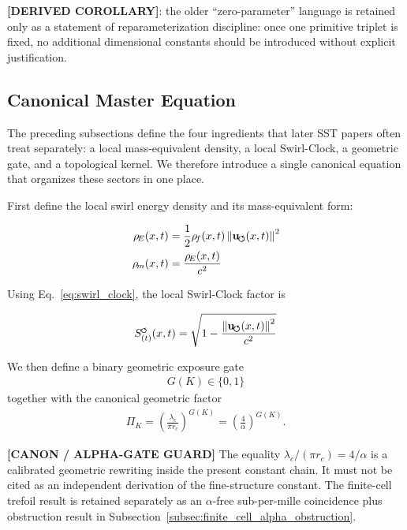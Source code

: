 \documentclass[11pt]{article}
\theoremstyle{definition}
\theoremstyle{plain}
\theoremstyle{remark}
\newcommand{\swirlarrow}{\mathchoice{\mkern-2mu\scriptstyle\boldsymbol{\circlearrowleft}}{\mkern-2mu\scriptstyle\boldsymbol{\circlearrowleft}}{\mkern-2mu\scriptscriptstyle\boldsymbol{\circlearrowleft}}{\mkern-2mu\scriptscriptstyle\boldsymbol{\circlearrowleft}}}
\newcommand{\rhoF}{{\rho_{\!f}}}
\newcommand{\rhoE}{\rho_{\!E}}
\newcommand{\rhoM}{\rho_{\!m}}
\newcommand{\SwirlClock}{{S_{(t)}^{\swirlarrow}}}
\newcommand{\rc}{{r_c}}
\newcommand{\uswirl}{\mathbf{u}_{\!\boldsymbol{\circlearrowleft}}}
\begin{document}
        \textbf{[DERIVED COROLLARY]}: the older ``zero-parameter'' language is retained only as a statement of reparameterization discipline: once one primitive triplet is fixed, no additional dimensional constants should be introduced without explicit justification.

    \subsection{Canonical Master Equation}
    \label{sec:master-equation}

        The preceding subsections define the four ingredients that later SST papers often treat separately:
        a local mass-equivalent density, a local Swirl-Clock, a geometric gate, and a topological kernel.
        We therefore introduce a single canonical equation that organizes these sectors in one place.

        First define the local swirl energy density and its mass-equivalent form:

        \begin{align}
            \rhoE(x,t) &= \frac{1}{2}\rhoF(x,t)\,\norm{\uswirl(x,t)}^2 \\
            \rhoM(x,t) &= \frac{\rhoE(x,t)}{c^2}
        \end{align}

        Using Eq.~\ref{eq:swirl_clock}, the local Swirl-Clock factor is

        \begin{align}
            \SwirlClock(x,t) = \sqrt{1 - \frac{\norm{\uswirl(x,t)}^2}{c^2}}
        \end{align}

        We then define a binary geometric exposure gate
        \begin{align}
            G(K) \in \{0,1\}
        \end{align}
        together with the canonical geometric factor
        \begin{align}
            \Pi_K = \left( \frac{\lambda_c}{\pi \rc} \right)^{G(K)} = \left( \frac{4}{\alpha} \right)^{G(K)} .
        \end{align}

        \textbf{[CANON / ALPHA-GATE GUARD]} The equality \(\lambda_c/(\pi\rc)=4/\alpha\) is a calibrated geometric rewriting inside the present constant chain. It must not be cited as an independent derivation of the fine-structure constant. The finite-cell trefoil result is retained separately as an \(\alpha\)-free sub-per-mille coincidence plus obstruction result in Subsection~\ref{subsec:finite_cell_alpha_obstruction}.
\end{document}
